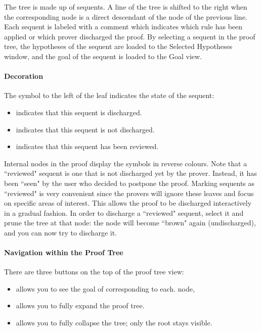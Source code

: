 The tree is made up of sequents. A line of the tree is shifted to the right when the corresponding node is a direct descendant of the node of the previous line. Each sequent is labeled with a comment which indicates which rule has been applied or which prover discharged the proof. By selecting a sequent in the proof tree, the hypotheses of the sequent are loaded to the \textsf{Selected Hypotheses window}, and the goal of the sequent is loaded to the \textsf{Goal view}.

\paragraph{Decoration}
The symbol to the left of the leaf indicates the state of the sequent:
\begin{itemize}
	\item {} indicates that this sequent is discharged.
	\item {} indicates that this sequent is not discharged.
	\item {} indicates that this sequent has been reviewed. 
\end{itemize}

Internal nodes in the proof display the symbols in reverse colours. Note that a ``reviewed" sequent is one that is not discharged yet by the prover. Instead, it has been ``seen" by the user who decided to postpone the proof. Marking sequents as ``reviewed" is very convenient since the provers will ignore these leaves and focus on specific areas of interest. This allows the proof to be discharged interactively in a gradual fashion. In order to discharge a ``reviewed" sequent, select it and prune the tree at that node: the node will become ``brown" again (undischarged), and you can now try to discharge it. 

\paragraph{Navigation within the Proof Tree}

There are three buttons on the top of the proof tree view:

\begin{itemize}
	\item {} allows you to see the goal of corresponding to each. node,
	\item {} allows you to fully expand the proof tree.
	\item {} allows you to fully collapse the tree; only the root stays visible. 
\end{itemize}

